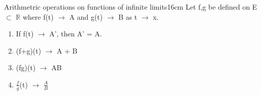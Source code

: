     \vspace{0.5cm}



    \begin{wtheorem}{Arithmetric operations on functions of infinite limits}{16cm}
        Let f,g be defined on E $\subset$ $\mathbb{R}$ where
        f(t) $\rightarrow$ A and g(t) $\rightarrow$ B as t $\rightarrow$ x.
    \end{wtheorem}

    \begin{enumerate}[label=(\alph*), leftmargin=2cm, itemsep=0.1cm]
        \item If f(t) $\rightarrow$ A', then A' = A.
        
        \item (f+g)(t) $\rightarrow$ A + B
        
        \item (fg)(t) $\rightarrow$ AB
        
        \item $\frac{f}{g}$(t) $\rightarrow$ $\frac{A}{B}$
    \end{enumerate}